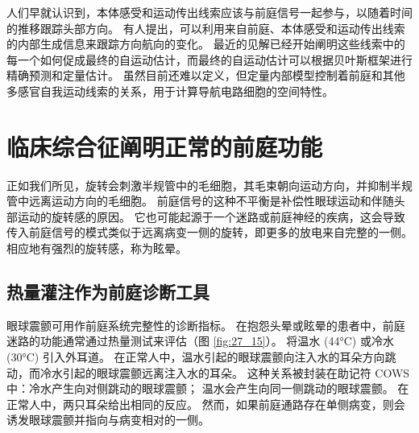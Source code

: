 人们早就认识到，本体感受和运动传出线索应该与前庭信号一起参与，以随着时间的推移跟踪头部方向。
有人提出，可以利用来自前庭、本体感受和运动传出线索的内部生成信息来跟踪方向航向的变化。
最近的见解已经开始阐明这些线索中的每一个如何促成最终的自运动估计，而最终的自运动估计可以根据贝叶斯框架进行精确预测和定量估计。
虽然目前还难以定义，但定量内部模型控制着前庭和其他多感官自我运动线索的关系，用于计算导航电路细胞的空间特性。




\section{临床综合征阐明正常的前庭功能}
正如我们所见，旋转会刺激半规管中的毛细胞，其毛束朝向运动方向，并抑制半规管中远离运动方向的毛细胞。
前庭信号的这种不平衡是补偿性眼球运动和伴随头部运动的旋转感的原因。
它也可能起源于一个迷路或前庭神经的疾病，这会导致传入前庭信号的模式类似于远离病变一侧的旋转，即更多的放电来自完整的一侧。
相应地有强烈的旋转感，称为眩晕。



\subsection{热量灌注作为前庭诊断工具}

眼球震颤可用作前庭系统完整性的诊断指标。
在抱怨头晕或眩晕的患者中，前庭迷路的功能通常通过热量测试来评估（图 \ref{fig:27_15}）。
将温水 (44°C) 或冷水 (30°C) 引入外耳道。
在正常人中，温水引起的眼球震颤向注入水的耳朵方向跳动，而冷水引起的眼球震颤远离注入水的耳朵。
这种关系被封装在助记符 COWS 中：冷水产生向对侧跳动的眼球震颤；
温水会产生向同一侧跳动的眼球震颤。
在正常人中，两只耳朵给出相同的反应。
然而，如果前庭通路存在单侧病变，则会诱发眼球震颤并指向与病变相对的一侧。


